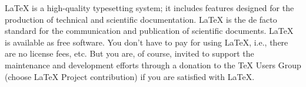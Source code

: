 \documentclass[11pt]{article}
\begin{document}
\setlength\baselineskip{12pt}
\noindent
LaTeX is a high-quality typesetting system; it includes features designed for the production of technical and scientific documentation. LaTeX is the de facto standard for the communication and publication of scientific documents. LaTeX is available as free software. You don't have to pay for using LaTeX, i.e., there are no license fees, etc. But you are, of course, invited to support the maintenance and development efforts through a donation to the TeX Users Group (choose LaTeX Project contribution) if you are satisfied with LaTeX.
\end{document}
